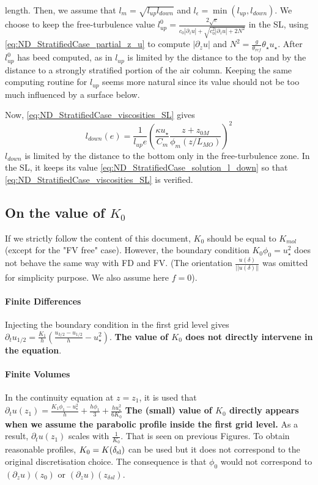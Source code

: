 length. Then, we assume that $l_m = \sqrt{l_{up}l_{down}}$ and
$l_\epsilon = \min(l_{up}, l_{down})$.
We choose to keep the free-turbulence value
$l_{up}^0 = \frac{2\sqrt{e}}
{c_0|\partial_z u| + \sqrt{c_0^2 |\partial_z u| + 2N^2}}$
in the SL, using \eqref{eq:ND_StratifiedCase_partial_z_u}
to compute $|\partial_z u|$ and
$N^2 = \frac{g}{\theta_{ref}}\theta_\star u_\star$.
After $l_{up}^0$ has beed computed, as in
\cite{lemarie2021gmd} $l_{up}$ is limited by
the distance to the top and by the distance to a strongly
stratified portion of the air column.
Keeping the same computing routine for $l_{up}$ seems
more natural since its value should not be too much
influenced by a surface below.
\par
Now, \eqref{eq:ND_StratifiedCase_viscosities_SL} gives
\begin{equation}
	\label{eq:ND_StratifiedCase_solution_l_down}
	l_{down}(e) = \frac{1}{l_{up} e} \left(
	\frac{\kappa u_\star}{C_m}
	\frac{z + z_{0M}}{\phi_m(z/L_{MO})}
\right)^2
\end{equation}
$l_{down}$ is limited by the distance to the bottom only
in the free-turbulence zone. In the SL, it keeps its value
\eqref{eq:ND_StratifiedCase_solution_l_down}
so that \eqref{eq:ND_StratifiedCase_viscosities_SL} is
verified.

\subsection{On the value of $K_0$}
\label{sec:ND_StratifiedCase_viscosity0_FVpure}
If we strictly follow the content of this document,
$K_0$ should be equal to $K_{mol}$ (except for the "FV free" case).
However, the boundary condition $K_0 \phi_0 = u_\star^2$
does not behave the same way with FD and FV.
(The orientation $\frac{u(\delta)}{||u(\delta)||}$
was omitted for simplicity purpose. We also assume here $f=0$).

\paragraph{Finite Differences}
Injecting the boundary condition in the first grid level gives
$\partial_t u_{1/2} = \frac{K_1}{h}\left(\frac{u_{3/2} - u_{1/2}}{h}
 - u_\star^2
\right)$.
\textbf{The value of $K_0$ does not directly intervene in the equation}.

\paragraph{Finite Volumes}
In the continuity equation at $z=z_1$, it is used that
$\partial_t u(z_1) = \frac{K_1 \phi_1 - u_\star^2}{h}
+ \frac{h \phi_1}{3} + \frac{h u_\star^2}{6 K_0}$
\textbf{The (small) value of $K_0$ directly appears when we assume the
parabolic profile inside the first grid level.}
As a result, $\partial_t u(z_1)$ scales with $\frac{1}{K_0}$.
That is seen
on previous Figures.
To obtain reasonable profiles, $K_0=K(\delta_{\rm sl})$ can be used
but it does not correspond to the original discretisation choice.
The consequence is that $\phi_0$ would not correspond
to $(\partial_z u)(z_0)$ or $(\partial_z u)(z_{\delta sl})$.
